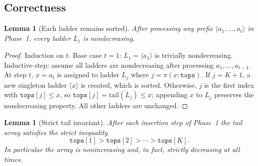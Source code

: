 \documentclass{ieeeaccess}
\theoremstyle{plain}
\newtheorem{lemma}[theorem]{Lemma}
\theoremstyle{definition}
\newcommand{\tops}{\texttt{tops}}
\begin{document}
\subsection{Correctness}
\label{sec:correctness}

\begin{lemma}[Each ladder remains sorted]
\label{lem:ladder_sorted}
After processing any prefix $\langle a_1, \dots, a_t \rangle$ in Phase~1,
every ladder $L_j$ is nondecreasing.
\end{lemma}

\begin{proof}
Induction on $t$.  Base case $t=1$: $L_1 = \langle a_1 \rangle$ is
trivially nondecreasing.  Inductive step: assume all ladders are
nondecreasing after processing $a_1, \dots, a_{t-1}$.  At step $t$,
$x = a_t$ is assigned to ladder $L_j$ where $j = \pi(x;\tops)$.  If
$j = K+1$, a new singleton ladder $\langle x \rangle$ is created, which
is sorted.  Otherwise, $j$ is the first index with $\tops[j] \le x$, so
$\tops[j] = \mathrm{tail}(L_j) \le x$; appending $x$ to $L_j$ preserves
the nondecreasing property.  All other ladders are unchanged.
\end{proof}

\begin{lemma}[Strict tail invariant]
\label{lem:tops_nonincreasing}
After each insertion step of Phase~1 the tail array satisfies the strict
inequality
\[ \tops[1] > \tops[2] > \cdots > \tops[K]. \]
In particular the array is nonincreasing and, in fact, strictly decreasing
at all times.
\end{lemma}
\end{document}
